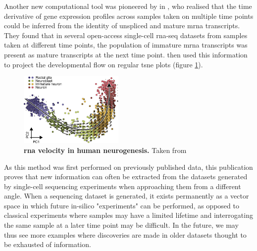 Another new computational tool was pioneered by \citeauthor{lamanno2018} in \citeyear{lamanno2018}, who realised that the time derivative of gene expression profiles across samples taken on multiple time points could be inferred from the identity of unspliced and mature \acrshort{mrna} transcripts. They found that in several open-access single-cell \acrshort{rna-seq} datasets from samples taken at different time points, the population of immature \acrshort{mrna} transcripts was present as mature transcripts at the next time point. \citeauthor{lamanno2018} then used this information to project the developmental flow on regular \acrshort{tsne} plots (figure \ref{fig:lamanno2018}).\pms

\begin{figure}
	\centering
	\includegraphics[width=0.45\textwidth]{./ims/lamanno2018.png}
	\caption[RNA velocity in human neurogenesis]{\textbf{\acrshort{rna} velocity in human neurogenesis.} Taken from \cite{lamanno2018}}
	\label{fig:lamanno2018}
	\vspace{20pt}
\end{figure}

As this method was first performed on previously published data, this publication proves that new information can often be extracted from the datasets generated by single-cell sequencing experiments when approaching them from a different angle. When a sequencing dataset is generated, it exists permanently as a vector space in which future in-silico "experiments" can be performed, as opposed to classical experiments where samples may have a limited lifetime and interrogating the same sample at a later time point may be difficult. In the future, we may thus see more examples where discoveries are made in older datasets thought to be exhausted of information.\pms

\clearpage
